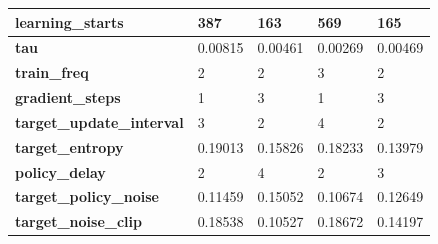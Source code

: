 \documentclass[../xlapes02]{subfiles}
\begin{document}
\begin{table}[H]
{\begin{tabular}{|l||l|l||l|l|}
                \textbf{learning\_starts}          & 387                                          & 163                                          & 569                                          & 165                                          \\ \hline
                \textbf{tau}                       & 0.00815                                      & 0.00461                                      & 0.00269                                      & 0.00469                                      \\ \hline
                \textbf{train\_freq}               & 2                                            & 2                                            & 3                                            & 2                                            \\ \hline
                \textbf{gradient\_steps}           & 1                                            & 3                                            & 1                                            & 3                                            \\ \hline
                \textbf{target\_update\_interval}  & 3                                            & 2                                            & 4                                            & 2                                            \\ \hline
                \textbf{target\_entropy}           & 0.19013                                      & 0.15826                                      & 0.18233                                      & 0.13979                                      \\ \hline
                \textbf{policy\_delay}             & 2                                            & 4                                            & 2                                            & 3                                            \\ \hline
                \textbf{target\_policy\_noise}     & 0.11459                                      & 0.15052                                      & 0.10674                                      & 0.12649                                      \\ \hline
                \textbf{target\_noise\_clip}       & 0.18538                                      & 0.10527                                      & 0.18672                                      & 0.14197                                      \\ \hline

\end{tabular}}
\end{table}
\end{document}
